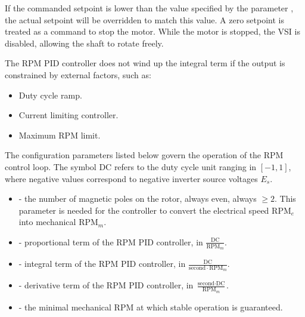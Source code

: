 \documentclass{zubaxdoc}
\begin{document}
If the commanded setpoint is lower than the value specified by the parameter \mbox{,}
the actual setpoint will be overridden to match this value.
A zero setpoint is treated as a command to stop the motor.
While the motor is stopped, the VSI is disabled, allowing the shaft to rotate freely.

The RPM PID controller does not wind up the integral term if the output is constrained by external factors,
such as:
\begin{itemize}
\item Duty cycle ramp.
\item Current limiting controller.
\item Maximum RPM limit.
\end{itemize}

The configuration parameters listed below govern the operation of the RPM control loop.
The symbol $\text{DC}$ refers to the duty cycle unit ranging in $\left[-1, 1\right]$,
where negative values correspond to negative inverter source voltages $E_s$.

\begin{itemize}
\item {} - the number of magnetic poles on the rotor, always even, always $\geq 2$.
This parameter is needed for the controller to convert the electrical speed $\text{RPM}_e$
into mechanical $\text{RPM}_m$.
\item {} - proportional term of the RPM PID controller,
in $\frac{\text{DC}}{\text{RPM}_m}$.
\item {} - integral term of the RPM PID controller,
in $\frac{\text{DC}}{\text{second}\cdot{}\text{RPM}_m}$.
\item {} - derivative term of the RPM PID controller,
in $\frac{\text{second}\cdot{}\text{DC}}{\text{RPM}_m}$.
\item {} - the minimal mechanical RPM at which stable operation is guaranteed.
\end{itemize}
\end{document}
